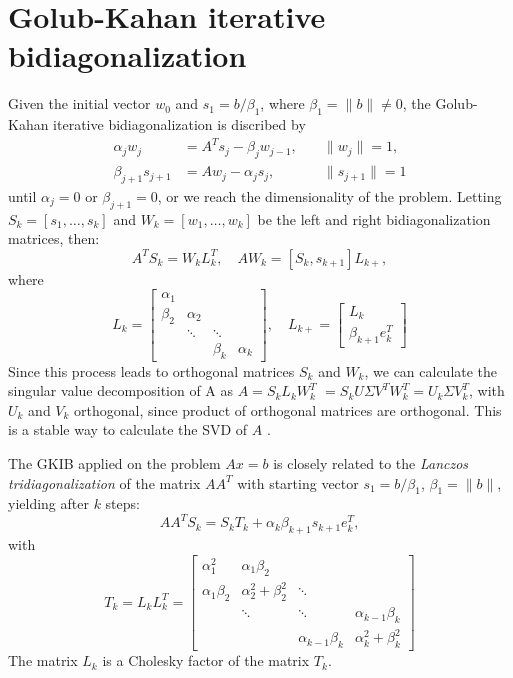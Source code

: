 \documentclass[11pt]{amsart}
\begin{document}
\section{Golub-Kahan iterative bidiagonalization}
Given the initial vector $w_{0}$ and $s_{1} = b/\beta_{1}$, where 
$\beta_{1} = \|b\| \neq 0$, the Golub-Kahan iterative bidiagonalization is
discribed by
\begin{align*}
  \alpha_{j}w_{j} &= A^{T}s_{j} - \beta_{j}w_{j-1}, &\quad \|w_{j}\|=1,\\
  \beta_{j+1}s_{j+1} &= Aw_{j} - \alpha_{j}s_{j}, &\quad \|s_{j+1}\|=1
\end{align*}
until $\alpha_{j} = 0$ or $\beta_{j+1} = 0$, or we reach the dimensionality of
the problem. Letting $S_{k} = [s_{1},\ldots,s_{k}]$ and 
$W_{k}= [w_{1},\ldots,w_{k}]$ be the left and right bidiagonalization matrices,
then:
\begin{equation*}
  A^{T}S_{k} = W_{k}L_{k}^{T}, \quad AW_{k} = [S_{k},s_{k+1}]L_{k+},
\end{equation*}
where
\begin{equation*}
  L_{k} =
  \begin{bmatrix}
    \alpha_{1} & & & \\
    \beta_{2} & \alpha_{2} & & \\
    & \ddots & \ddots & \\
    & & \beta_{k} & \alpha_{k}
  \end{bmatrix}, \quad
  L_{k+} = 
  \begin{bmatrix}
    L_{k} \\
    \beta_{k+1}e_{k}^{T}
  \end{bmatrix}
\end{equation*}
Since this process leads to orthogonal matrices $S_{k}$ and $W_{k}$, we can
calculate the singular value decomposition of A as $A = S_{k}L_{k}W_{k}^{T}$
$= S_{k}U\Sigma V^{T}W_{k}^{T} = U_{k}\Sigma V_{k}^{T}$, with $U_{k}$ and 
$V_{k}$ orthogonal, since product of orthogonal matrices are orthogonal. This is
a stable way to calculate the SVD of $A$ \cite{svdRef}.

The GKIB applied on the problem $Ax = b$ is closely related to the
\emph{Lanczos tridiagonalization} of the matrix $AA^{T}$ with starting vector
$s_{1} = b/\beta_{1}$, $\beta_{1} = \|b\|$, yielding after $k$ steps:
\begin{equation} \label{eq:tridiag}
  AA^{T}S_{k} = S_{k}T_{k} + \alpha_{k}\beta_{k+1}s_{k+1}e_{k}^{T},
\end{equation}
with
\begin{equation*}
  T_{k} = L_{k}L_{k}^{T} = 
  \begin{bmatrix}
    \alpha_{1}^{2} & \alpha_{1}\beta_{2} & & \\
    \alpha_{1}\beta_{2} & \alpha_{2}^{2} + \beta_{2}^{2} & \ddots & \\
    & \ddots & \ddots & \alpha_{k-1}\beta_{k} \\
    & & \alpha_{k-1}\beta_{k} & \alpha_{k}^{2} + \beta_{k}^{2}
  \end{bmatrix}
\end{equation*}
The matrix $L_{k}$ is a Cholesky factor of the matrix $T_{k}$.
\end{document}
